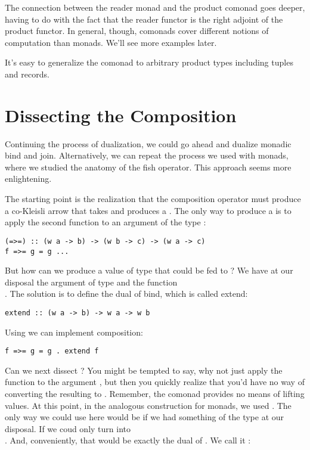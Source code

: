 The connection between the reader monad and the product comonad goes
deeper, having to do with the fact that the reader functor is the right
adjoint of the product functor. In general, though, comonads cover
different notions of computation than monads. We'll see more examples
later.

It's easy to generalize the  comonad to arbitrary
product types including tuples and records.

\section{Dissecting the
Composition}\label{dissecting-the-composition}

Continuing the process of dualization, we could go ahead and dualize
monadic bind and join. Alternatively, we can repeat the process we used
with monads, where we studied the anatomy of the fish operator. This
approach seems more enlightening.

The starting point is the realization that the composition operator must
produce a co-Kleisli arrow that takes  and produces a
. The only way to produce a  is to apply the second
function to an argument of the type :

\begin{verbatim}
(=>=) :: (w a -> b) -> (w b -> c) -> (w a -> c)
f =>= g = g ... 
\end{verbatim}
But how can we produce a value of type  that could be fed
to ? We have at our disposal the argument of type
 and the function\\ .
The solution is to define the dual of bind, which is called extend:

\begin{verbatim}
extend :: (w a -> b) -> w a -> w b
\end{verbatim}
Using  we can implement composition:

\begin{verbatim}
f =>= g = g . extend f
\end{verbatim}
Can we next dissect ? You might be tempted to say, why
not just apply the function  to the
argument , but then you quickly realize that you'd have no
way of converting the resulting  to . Remember,
the comonad provides no means of lifting values. At this point, in the
analogous construction for monads, we used . The only way
we could use  here would be if we had something of the type
 at our disposal. If we coud only turn 
into\\ . And, conveniently, that would be exactly the
dual of . We call it :

